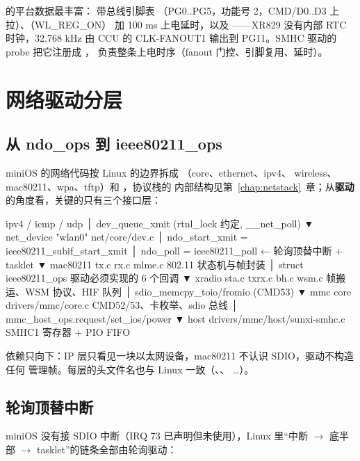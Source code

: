  的平台数据最丰富： 带总线引脚表
（PG0..PG5，功能号 2，CMD/D0..D3 上拉）、（WL\_REG\_ON）
加 100 ms 上电延时，以及 ——XR829 没有内部 RTC 时钟，32.768 kHz
由 CCU 的 CLK-FANOUT1 输出到 PG11。SMHC 驱动的 probe 把它注册成 ，
 负责整条上电时序（fanout 门控、引脚复用、延时）。

\section{网络驱动分层}

\subsection{从 ndo\_ops 到 ieee80211\_ops}

miniOS 的网络代码按 Linux 的边界拆成 （core、ethernet、ipv4、
wireless、mac80211、wpa、tftp）和 ，协议栈的
内部结构见第~\ref{chap:netstack}~章；从\textbf{驱动}的角度看，关键的只有三个接口层：

\begin{txtcode}
ipv4 / icmp / udp
   │ dev_queue_xmit                      (rtnl_lock 约定, __net_poll)
   ▼
net_device "wlan0"                       net/core/dev.c
   │ ndo_start_xmit = ieee80211_subif_start_xmit
   │ ndo_poll      = ieee80211_poll      ← 轮询顶替中断 + tasklet
   ▼
mac80211  tx.c rx.c mlme.c               802.11 状态机与帧封装
   │ struct ieee80211_ops                驱动必须实现的 6 个回调
   ▼
xradio   sta.c txrx.c bh.c wsm.c         帧搬运、WSM 协议、HIF 队列
   │ sdio_memcpy_toio/fromio (CMD53)
   ▼
mmc core  drivers/mmc/core.c             CMD52/53、卡枚举、sdio 总线
   │ mmc_host_ops.request/set_ios/power
   ▼
host     drivers/mmc/host/sunxi-smhc.c   SMHC1 寄存器 + PIO FIFO
\end{txtcode}

依赖只向下：IP 层只看见一块以太网设备，mac80211 不认识 SDIO，驱动不构造任何
管理帧。每层的头文件名也与 Linux 一致（、、
\ldots）。

\subsection{轮询顶替中断}

miniOS 没有接 SDIO 中断（IRQ 73 已声明但未使用），Linux 里``中断 $\rightarrow$ 底半部
$\rightarrow$ tasklet''的链条全部由轮询驱动：

